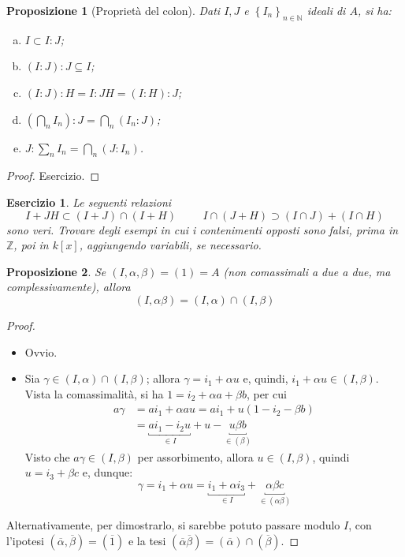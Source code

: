 \documentclass[12pt]{scrartcl}
\theoremstyle{style}
\newtheorem{prop}{Proposizione}[section]
\theoremstyle{style1}
\newtheorem{esercizio}{Esercizio}[section]
\numberwithin{equation}{subsection}
\begin{document}
\begin{prop}
	[Propriet\`a del colon]
	Dati $I,J$ e $\left\{ I_n \right\} _{n\in \mathbb{N}} $ ideali di $A$, si ha:
	\begin{enumerate}[(a).]
		\item $I \subset I:J$;
		\item $(I:J):J \subseteq I$;
		\item $(I:J):H = I:JH = (I:H):J$;
		\item $\left(\bigcap_n I_n\right) :J = \bigcap _n(I_n:J)$;
		\item $J:\sum_n I_n = \bigcap _n (J:I_n)$.
	\end{enumerate}
\end{prop}
\begin{proof}
	{\color{red}Esercizio.}
\end{proof}
\begin{esercizio}
Le seguenti relazioni
\[
I+JH \subset (I+J)\cap (I+H) \hspace{1cm}I\cap (J+H) \supset (I\cap J)+(I\cap H)
\] 
sono veri.
Trovare degli esempi in cui i contenimenti opposti sono falsi, prima in $\mathbb{Z}$, poi in $k[x]$, aggiungendo variabili, se necessario.
\end{esercizio}
\begin{prop}
Se $(I,\alpha ,\beta )=(1) = A$ (non comassimali a due a due, ma complessivamente), allora
\[
	(I,\alpha \beta ) = (I,\alpha ) \cap (I,\beta )
\] 
\end{prop}
\begin{proof}
\ 

\begin{itemize}
	\item[$(\subseteq)$] Ovvio.
	\item[$(\supseteq)$] Sia $\gamma \in (I,\alpha ) \cap (I,\beta )$; allora $\gamma = i_1 + \alpha  u $ e, quindi, $ i_1+\alpha u \in (I,\beta )$.
		Vista la comassimalit\`a, si ha $1 = i_2+\alpha a + \beta b$, per cui
		\[
			\begin{split}
				a \gamma &= a i_1 + \alpha a u = ai_1 + u(1-i_2-\beta b)\\
					 &=\underbracket{a i_1 - i_2 u}_{\in I} + u - \underbracket{u\beta b}_{\in (\beta )} 
			\end{split}
		\] 
		Visto che $a\gamma\in (I,\beta )$ per assorbimento, allora $u \in (I,\beta )$, quindi $u = i_3 + \beta c$ e, dunque:
		\[
			\gamma = i_1 + \alpha u = \underbracket{i_1+\alpha i_3}_{\in I} + \underbracket{\alpha \beta c}_{\in (\alpha \beta )} 
		\] 
\end{itemize}
Alternativamente, per dimostrarlo, si sarebbe potuto passare modulo $I$, con l'ipotesi $(\overline{\alpha },\overline{\beta }) = (\overline{1})$ e la tesi $(\overline{\alpha }\overline{\beta })=(\overline{\alpha }) \cap (\overline{\beta })$.
\end{proof}
\end{document}
